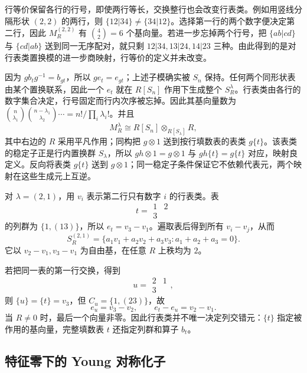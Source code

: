 行等价保留各行的行号，即使两行等长，交换整行也会改变行表类。例如用竖线分隔形状 \((2,2)\) 的两行，则 \(\{12|34\}\ne\{34|12\}\)。选择第一行的两个数字便决定第二行，因此 \(M_R^{(2,2)}\) 有 \(\binom{4}{2}=6\) 个基向量。若进一步忘掉两个行号，把 \(\{ab|cd\}\) 与 \(\{cd|ab\}\) 送到同一无序配对，就只剩 \(12|34,13|24,14|23\) 三种。由此得到的是对行表类置换模的进一步商映射，行等价的定义并未改变。

\ProseParagraphBreak

因为 \(g b_t g^{-1}=b_{gt}\)，所以 \(g e_t=e_{gt}\)；上述子模确实被 \(S_n\) 保持。任何两个同形状表由某个置换联系，因此一个 \(e_t\) 就在 \(R[S_n]\) 作用下生成整个 \(S_R^\lambda\)。行表类由各行的数字集合决定，行号固定而行内次序被忘掉。因此其基向量数为 \(\binom n{\lambda_1}\binom{n-\lambda_1}{\lambda_2}\cdots=n!/\prod_i\lambda_i!\)。并且
\[
	M_R^\lambda\cong R[S_n]\otimes_{R[S_\lambda]}R,
\]
其中右边的 \(R\) 采用平凡作用；同构把 \(g\otimes1\) 送到按行填数表的表类 \(g\{t\}\)。该表类的稳定子正是行内置换群 \(S_\lambda\)，所以 \(gh\otimes1=g\otimes1\) 与 \(gh\{t\}=g\{t\}\) 对应，映射良定义。反向将表类 \(g\{t\}\) 送到 \(g\otimes1\)；同一稳定子条件保证它不依赖代表元，两个映射在这些生成元上互逆。

\begin{example}\label{b5:exm:specht-21}
	对 \(\lambda=(2,1)\)，用 \(v_i\) 表示第二行只有数字 \(i\) 的行表类。表
	\[
		t=\begin{array}{cc}1&2\\3&\end{array}
	\]
	的列群为 \(\bigl\{1,(13)\bigr\}\)，所以 \(e_t=v_3-v_1\)。遍取表后得到所有 \(v_i-v_j\)，从而
	\[
		S_R^{(2,1)} =\{a_1v_1+a_2v_2+a_3v_3:a_1+a_2+a_3=0\}.
	\]
	它以 \(v_2-v_1,v_3-v_1\) 为自由基，在任意 \(R\) 上秩均为 \(2\)。

	若把同一表的第一行交换，得到
	\[
		u=\begin{array}{cc}2&1\\3&\end{array},
	\]
	则 \(\{u\}=\{t\}=v_3\)，但 \(C_u=\{1,(23)\}\)，故
	\[
		e_u=v_3-v_2,\qquad e_t-e_u=v_2-v_1.
	\]
	当 \(R\ne0\) 时，最后一个向量非零。因此行表类并不唯一决定列交错元：\(\{t\}\) 指定被作用的基向量，完整填数表 \(t\) 还指定列群和算子 \(b_t\)。
\end{example}

\subsection{特征零下的 Young 对称化子}
\label{b5:subsec:0602:02}

